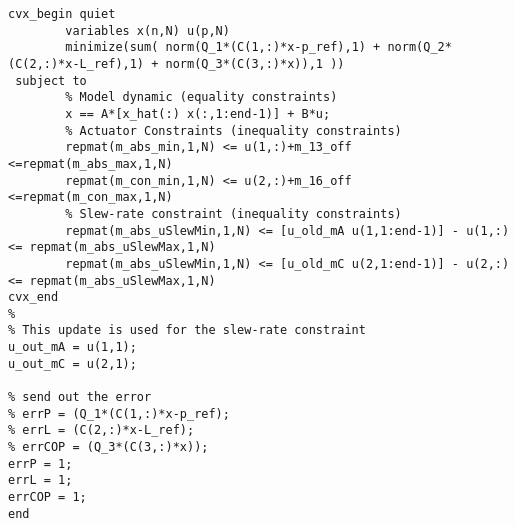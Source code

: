 \begin{lstlisting}
cvx_begin quiet
        variables x(n,N) u(p,N)
        minimize(sum( norm(Q_1*(C(1,:)*x-p_ref),1) + norm(Q_2*(C(2,:)*x-L_ref),1) + norm(Q_3*(C(3,:)*x)),1 ))     
 subject to
        % Model dynamic (equality constraints)
        x == A*[x_hat(:) x(:,1:end-1)] + B*u;
        % Actuator Constraints (inequality constraints)
        repmat(m_abs_min,1,N) <= u(1,:)+m_13_off <=repmat(m_abs_max,1,N)
        repmat(m_con_min,1,N) <= u(2,:)+m_16_off <=repmat(m_con_max,1,N)
        % Slew-rate constraint (inequality constraints)
        repmat(m_abs_uSlewMin,1,N) <= [u_old_mA u(1,1:end-1)] - u(1,:) <= repmat(m_abs_uSlewMax,1,N)
        repmat(m_abs_uSlewMin,1,N) <= [u_old_mC u(2,1:end-1)] - u(2,:) <= repmat(m_abs_uSlewMax,1,N)
cvx_end
%
% This update is used for the slew-rate constraint 
u_out_mA = u(1,1); 
u_out_mC = u(2,1); 

% send out the error
% errP = (Q_1*(C(1,:)*x-p_ref);
% errL = (C(2,:)*x-L_ref);
% errCOP = (Q_3*(C(3,:)*x));
errP = 1;
errL = 1;
errCOP = 1;
end
\end{lstlisting}